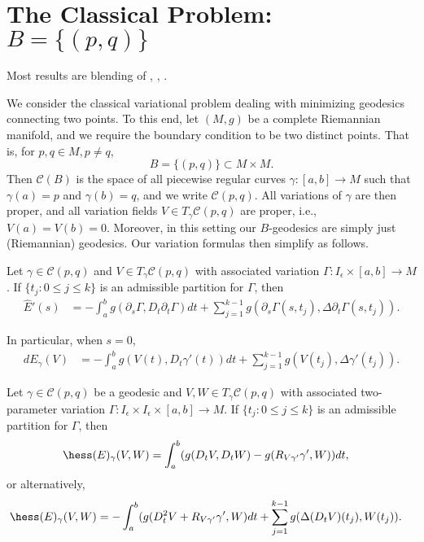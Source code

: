 


\section{The Classical Problem: $B=\{(p,q)\}$}

\begin{tcolorbox}
Most results are blending of \cite{klingenberg1995riemannian}, \cite{lee2006riemannian}, \cite{sakai1996riemannian}.	
\end{tcolorbox}



We consider the classical variational problem dealing with minimizing geodesics connecting two points.  To this end, let $(M,g)$ be a complete Riemannian manifold, and we require the boundary condition to be two distinct points.  That is, for $p,q\in M, p\neq q$,
$$B=\{(p,q)\}\subset M\times M.$$
Then $\mathcal{C}(B)$ is the space of all piecewise regular curves $\gamma:[a,b]\to M$ such that $\gamma(a)=p$ and $\gamma(b)=q$, and we write $\mathcal{C}(p,q)$. All variations of $\gamma$ are then proper, and all variation fields $V\in T_\gamma\mathcal{C}(p,q)$ are proper, i.e., $V(a)=V(b)=0$.  Moreover, in this setting our $B$-geodesics are simply just (Riemannian) geodesics.  Our variation formulas then simplify as follows.

\begin{thm}
    Let $\gamma\in\mathcal{C}(p,q)$ and $V\in T_\gamma\mathcal{C}(p,q)$ with associated variation $\Gamma:I_\epsilon\times[a,b]\to M$.  If $\{t_j:0\leq j\leq k\}$ is an admissible partition for $\Gamma$, then
    	\begin{align*}
    		\hat{E}'(s)&=-\int_a^bg(\partial_s\Gamma,D_t\partial_t\Gamma)dt+\sum_{j=1}^{k-1}g(\partial_s\Gamma(s,t_j),\Delta\partial_t\Gamma(s,t_j)).
    	\end{align*}
    	
    	In particular, when $s=0$,
	\begin{align*}
		dE_\gamma(V)&=-\int_a^bg(V(t),D_t\gamma'(t))dt+\sum_{j=1}^{k-1}g(V(t_j),\Delta\gamma'(t_j)).
	\end{align*}
\end{thm}

\begin{thm}
    Let $\gamma\in\mathcal{C}(p,q)$ be a geodesic and $V,W\in T_\gamma\mathcal{C}(p,q)$ with associated two-parameter variation $\Gamma:I_\epsilon\times I_\epsilon\times[a,b]\to M$.  If $\{t_j:0\leq j\leq k\}$ is an admissible partition for $\Gamma$, then
	\begin{align*}
		\hess(E)_\gamma(V,W)&=\int_a^b(g(D_tV,D_tW)-g(R_{V\gamma'}\gamma',W))dt,
	\end{align*}
	or alternatively,
	\begin{align*}
		&\hess(E)_\gamma(V,W)=-\int_a^b(g(D_t^2V+R_{V\gamma'}\gamma',W)dt+\sum_{j=1}^{k-1}g(\Delta(D_tV)(t_j),W(t_j)).
	\end{align*}
\end{thm}



